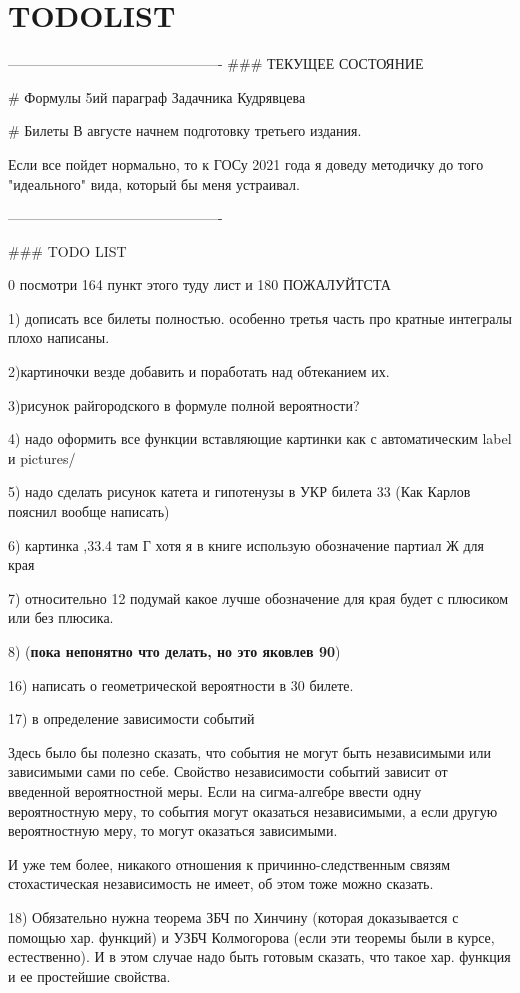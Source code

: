 \chapter{TODOLIST}
----------------------------------------------
### ТЕКУЩЕЕ СОСТОЯНИЕ

# Формулы
5ий параграф Задачника Кудрявцева

# Билеты 
В августе начнем подготовку третьего издания. 

Если все пойдет нормально, то к ГОСу 2021 года я доведу методичку до того "идеального" вида, который бы меня устраивал.

----------------------------------------------

### TODO LIST

0 посмотри 164 пункт этого туду лист и 180 ПОЖАЛУЙТСТА

1) дописать все билеты полностью. особенно третья часть про кратные интегралы плохо написаны.

2)картиночки везде добавить и поработать над обтеканием их.
 
3)рисунок райгородского в формуле полной вероятности? 
 
4) надо оформить все функции вставляющие картинки как \usepict с автоматическим label и pictures/
 
5) надо сделать рисунок катета и гипотенузы в УКР билета 33
(Как Карлов пояснил вообще написать)
 
6) картинка ,33.4 там Г хотя я в книге использую обозначение партиал Ж для края

7) относительно 12 подумай какое лучше обозначение для края будет с плюсиком или без плюсика. 

8) (\textbf{пока непонятно что делать, но это яковлев 90})

16) написать о геометрической вероятности в 30 билете.

17) в определение зависимости событий

Здесь было бы полезно сказать, что события не могут быть независимыми или зависимыми сами по себе. Свойство независимости событий зависит от введенной вероятностной меры. Если на сигма-алгебре ввести одну вероятностную меру, то события могут оказаться независимыми, а если другую вероятностную меру, то могут оказаться зависимыми.

И уже тем более, никакого отношения к причинно-следственным связям стохастическая независимость не имеет, об этом тоже можно сказать.

18) Обязательно нужна теорема ЗБЧ по Хинчину (которая доказывается с помощью хар. функций) и УЗБЧ Колмогорова (если эти теоремы были в курсе, естественно). И в этом случае надо быть готовым сказать, что такое хар. функция и ее простейшие свойства.

